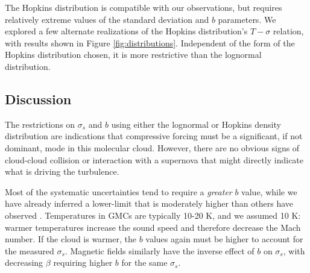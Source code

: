 The Hopkins distribution is compatible with our observations, but requires
relatively extreme values of the standard deviation and $b$ parameters.  
We explored a few alternate realizations of the Hopkins distribution's
$T-\sigma$ relation, with results shown in Figure \ref{fig:distributions}.
Independent of the form of the Hopkins distribution chosen, it is more
restrictive than the lognormal distribution.


% 
% 
% 

\subsection{Discussion}
The restrictions on $\sigma_s$ and $b$ using either the lognormal or Hopkins density
distribution are indications that compressive forcing must be a significant, if
not dominant, mode in this molecular cloud.  However, there are no obvious
signs of cloud-cloud collision or interaction with a supernova that might
directly indicate what is driving the turbulence.

Most of the systematic uncertainties tend to require a \emph{greater} $b$
value, while we have already inferred a lower-limit
that is moderately higher than others have observed \citep{Brunt2010c,Kainulainen2013a}.
Temperatures in GMCs are typically 10-20 K, and we assumed 10 K: warmer
temperatures increase the sound speed and therefore decrease the Mach number. If
the cloud is warmer, the $b$ values again must be higher to account for the measured
$\sigma_s$.  Magnetic fields similarly have the inverse effect of $b$ on
$\sigma_s$, with decreasing $\beta$ requiring higher $b$ for the same
$\sigma_s$.

